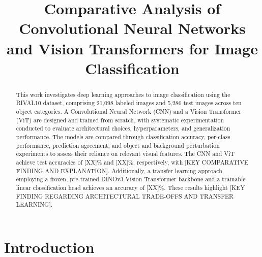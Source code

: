 \documentclass[conference]{IEEEtran}
\begin{document}

\title{Comparative Analysis of Convolutional Neural Networks
and Vision Transformers for Image Classification}

\author{
}

\maketitle


\begin{abstract}
This work investigates deep learning approaches to image
classification using the RIVAL10 dataset, comprising 21,098
labeled images and 5,286 test images across ten object
categories. A Convolutional 
Neural Network (CNN) and a Vision Transformer (ViT) are designed and 
trained from scratch, with systematic experimentation conducted to 
evaluate architectural choices, hyperparameters, and generalization 
performance. The models are compared through classification accuracy, 
per-class performance, prediction agreement, and object and background 
perturbation experiments to assess their reliance on relevant visual 
features. The CNN and ViT achieve test accuracies of [XX]\% and 
[XX]\%, respectively, with [KEY COMPARATIVE FINDING AND EXPLANATION]. 
Additionally, a transfer learning approach employing a frozen, pre-trained DINOv3 Vision Transformer backbone and a trainable linear classification head achieves an accuracy of [XX]\%. These results highlight 
[KEY FINDING REGARDING ARCHITECTURAL TRADE-OFFS AND TRANSFER LEARNING].
\end{abstract}


\section{Introduction}
\label{sec:introduction}
\end{document}
